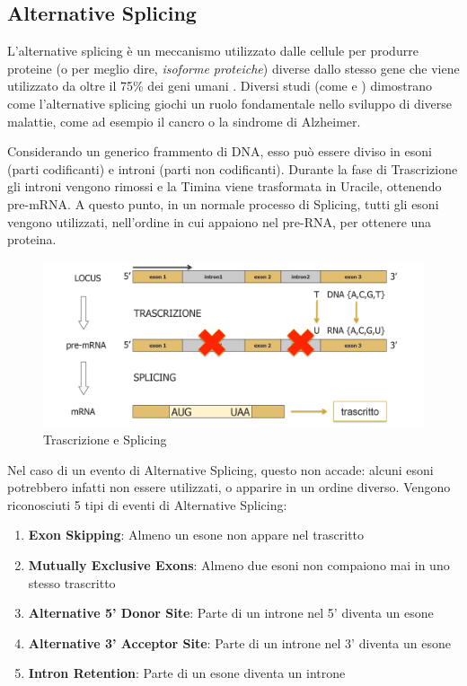 \subsection{Alternative Splicing}

L'alternative splicing è un meccanismo utilizzato dalle cellule per produrre proteine (o per meglio dire, \textit{isoforme proteiche}) diverse dallo stesso gene che viene utilizzato da oltre il 75\% dei geni umani \cite{ASExon}. Diversi studi (come \cite{ASDiseases} e \cite{ASAlzheimer}) dimostrano come l'alternative splicing giochi un ruolo fondamentale nello sviluppo di diverse malattie, come ad esempio il cancro o la sindrome di Alzheimer.

Considerando un generico frammento di DNA, esso può essere diviso in esoni (parti codificanti) e introni (parti non codificanti). Durante la fase di Trascrizione gli introni vengono rimossi e la Timina viene trasformata in Uracile, ottenendo pre-mRNA. A questo punto, in un normale processo di Splicing, tutti gli esoni vengono utilizzati, nell'ordine in cui appaiono nel pre-RNA, per ottenere una proteina.

\begin{figure}[h!]
	\centering
	\includegraphics[width=\linewidth]{images/splicing.png}
  \caption{Trascrizione e Splicing}
  \label{fig:Splicing}
\end{figure}

Nel caso di un evento di Alternative Splicing, questo non accade: alcuni esoni potrebbero infatti non essere utilizzati, o apparire in un ordine diverso. Vengono riconosciuti 5 tipi di eventi di Alternative Splicing:

\begin{enumerate}
	\item \textbf{Exon Skipping}: Almeno un esone non appare nel trascritto
	\item \textbf{Mutually Exclusive Exons}: Almeno due esoni non compaiono mai in uno stesso trascritto
	\item \textbf{Alternative 5' Donor Site}: Parte di un introne nel 5' diventa un esone
	\item \textbf{Alternative 3' Acceptor Site}: Parte di un introne nel 3' diventa un esone
	\item \textbf{Intron Retention}: Parte di un esone diventa un introne
\end{enumerate}

